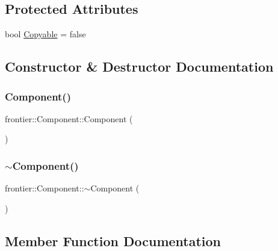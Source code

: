 \subsection*{Protected Attributes}
\begin{DoxyCompactItemize}
\item 
bool \hyperlink{classfrontier_1_1_component_a02ebe1c95395e16efa33ddc8499c259c}{Copyable} = false
\end{DoxyCompactItemize}


\subsection{Constructor \& Destructor Documentation}
\mbox{\label{classfrontier_1_1_component_a21f8f2b1292143a1e74d985024e34589}} 
\subsubsection{\texorpdfstring{Component()}{Component()}}
{\footnotesize\ttfamily frontier\+::\+Component\+::\+Component (\begin{DoxyParamCaption}{ }\end{DoxyParamCaption})}

\mbox{\label{classfrontier_1_1_component_a919c8260a4e6c1a14165bf9d1b903423}} 
\subsubsection{\texorpdfstring{$\sim$\+Component()}{~Component()}}
{\footnotesize\ttfamily frontier\+::\+Component\+::$\sim$\+Component (\begin{DoxyParamCaption}{ }\end{DoxyParamCaption})}



\subsection{Member Function Documentation}
\mbox{\label{classfrontier_1_1_component_a22c7d6b053ca38af4ba1e2a9e16c9a57}} 
